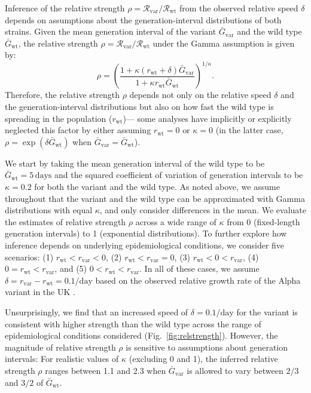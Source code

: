 \documentclass[12pt]{article}
\newcommand{\fref}[1]{Fig.~\ref{fig:#1}}
\newcommand{\vvvar}{\mathrm{var}}
\newcommand{\wwwt}{\mathrm{wt}}
\newcommand{\rx}[1]{\ensuremath{{r}_{#1}}\xspace}
\newcommand{\rw}{\rx{\wwwt}}
\newcommand{\rv}{\rx{\vvvar}}
\newcommand{\Rx}[1]{\ensuremath{{\mathcal R}_{#1}}\xspace}
\newcommand{\Rw}{\Rx{\wwwt}}
\newcommand{\Rv}{\Rx{\vvvar}}
\newcommand{\days}{\ensuremath{\, \textrm{days}}}
\newcommand{\pday}{\ensuremath{/\textrm{day}}}
\newcommand{\Gx}[1]{\ensuremath{{\bar G}_{#1}}\xspace}
\newcommand{\Gw}{\Gx{\wwwt}}
\newcommand{\Gv}{\Gx{\vvvar}}
\begin{document}
Inference of the relative strength $\rho = \Rv/\Rw$ from the observed relative speed $\delta$ depends on assumptions about the generation-interval distributions of both strains.
Given the mean generation interval of the variant $\Gv$ and the wild type $\Gw$, the relative strength $\rho = \Rv/\Rw$ under the Gamma assumption \citep{park2019practical} is given by:
\begin{equation}
\rho = \left(\frac{1 + \kappa (\rw + \delta) \Gv}{1 + \kappa \rw \Gw}\right)^{1/\kappa}.
\end{equation}
Therefore, the relative strength $\rho$ depends not only on the relative speed $\delta$ and the generation-interval distributions but also on how fast the wild type is spreading in the population (\rw)---
some analyses have implicitly or explicitly neglected this factor by either assuming $\rw = 0$ \citep{switzerland2021variant} or $\kappa = 0$ \citep{davies2021estimated} (in the latter case, $\rho = \exp(\delta \Gw)$ when $\Gv=\Gw$).

We start by taking the mean generation interval of the wild type to be $\Gw = 5\days$ \citep{ferretti2020quantifying} and the squared coefficient of variation of generation intervals to be $\kappa=0.2$ \citep{ferretti2020quantifying} for both the variant and the wild type.
As noted above, we assume throughout that the variant and the wild type can be approximated with Gamma distributions with equal $\kappa$, and only consider differences in the mean.
We evaluate the estimates of relative strength $\rho$ across a wide range of $\kappa$ from 0 (fixed-length generation intervals) to 1 (exponential distributions).
To further explore how inference depends on underlying epidemiological conditions, we consider five scenarios: (1) $\rw < \rv < 0$, (2) $\rw < \rv = 0$, (3) $\rw < 0 < \rv$, (4) $0 = \rw < \rv$, and (5) $0 < \rw < \rv$.
In all of these cases, we assume $\delta = \rv - \rw = 0.1\pday$ based on the observed relative growth rate of the Alpha variant in the UK \citep{davies2021estimated}.

Unsurprisingly, we find that an increased speed of $\delta=0.1\pday$ for the variant is consistent with higher strength than the wild type across the range of epidemiological conditions considered (\fref{relstrength}).
However, the magnitude of relative strength $\rho$ is sensitive to assumptions about generation intervals:
For realistic values of $\kappa$ (excluding 0 and 1), the inferred relative strength $\rho$ ranges between 1.1 and 2.3 when $\Gv$ is allowed to vary between $2/3$ and $3/2$ of \Gw.
\end{document}

